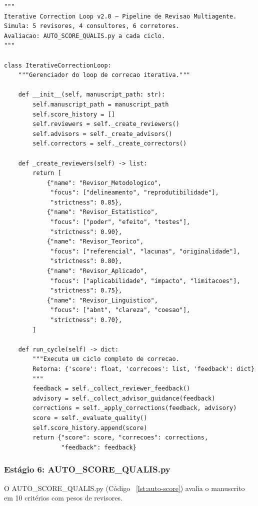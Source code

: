\begin{lstlisting}[caption={iterative\_correction\_loop.py (abreviado)},
label={lst:correction-loop}, style=pythonstyle]
"""
Iterative Correction Loop v2.0 — Pipeline de Revisao Multiagente.
Simula: 5 revisores, 4 consultores, 6 corretores.
Avaliacao: AUTO_SCORE_QUALIS.py a cada ciclo.
"""

class IterativeCorrectionLoop:
    """Gerenciador do loop de correcao iterativa."""

    def __init__(self, manuscript_path: str):
        self.manuscript_path = manuscript_path
        self.score_history = []
        self.reviewers = self._create_reviewers()
        self.advisors = self._create_advisors()
        self.correctors = self._create_correctors()

    def _create_reviewers(self) -> list:
        return [
            {"name": "Revisor_Metodologico",
             "focus": ["delineamento", "reprodutibilidade"],
             "strictness": 0.85},
            {"name": "Revisor_Estatistico",
             "focus": ["poder", "efeito", "testes"],
             "strictness": 0.90},
            {"name": "Revisor_Teorico",
             "focus": ["referencial", "lacunas", "originalidade"],
             "strictness": 0.80},
            {"name": "Revisor_Aplicado",
             "focus": ["aplicabilidade", "impacto", "limitacoes"],
             "strictness": 0.75},
            {"name": "Revisor_Linguistico",
             "focus": ["abnt", "clareza", "coesao"],
             "strictness": 0.70},
        ]

    def run_cycle(self) -> dict:
        """Executa um ciclo completo de correcao.
        Retorna: {'score': float, 'correcoes': list, 'feedback': dict}
        """
        feedback = self._collect_reviewer_feedback()
        advisory = self._collect_advisor_guidance(feedback)
        corrections = self._apply_corrections(feedback, advisory)
        score = self._evaluate_quality()
        self.score_history.append(score)
        return {"score": score, "correcoes": corrections,
                "feedback": feedback}
\end{lstlisting}

\subsubsection{Estágio 6: AUTO\_SCORE\_QUALIS.py}

O AUTO\_SCORE\_QUALIS.py (Código~ \ref{lst:auto-score}) avalia o
manuscrito em 10 critérios com pesos de revisores.

